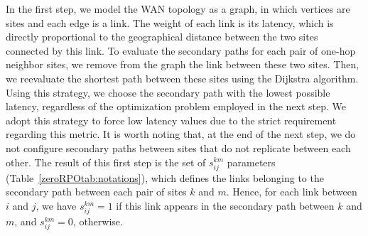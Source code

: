 \documentclass[preprint]{elsarticle}
\begin{document}
In the first step, we model the WAN topology as a graph, in which vertices are sites and each edge is a link. The weight of each link is its latency, which is directly proportional to the geographical distance between the two sites connected by this link. To evaluate the secondary paths for each pair of one-hop neighbor sites, we remove from the graph the link between these two sites. Then, we reevaluate the shortest path between these sites using the Dijkstra algorithm. Using this strategy, we choose the secondary path with the lowest possible latency, regardless of the optimization problem employed in the next step. We adopt this strategy to force low latency values due to the strict requirement regarding this metric. It is worth noting that, at the end of the next step, we do not configure secondary paths between sites that do not replicate between each other.
The result of this first step is the set of $s^{km}_{ij}$ parameters (Table~\ref{zeroRPOtab:notations}), which defines the links belonging to the secondary path between each pair of sites $k$ and $m$. Hence, for each link between $i$ and $j$, we have $s^{km}_{ij} = 1$ if this link appears in the secondary path between $k$ and $m$, and $s^{km}_{ij} = 0$, otherwise.
\end{document}
